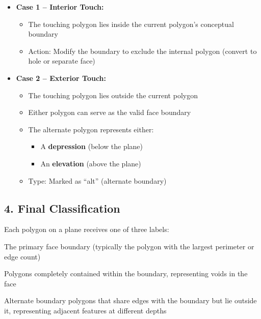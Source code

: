 \documentclass[11pt,a4paper]{article}
\begin{document}
\begin{itemize}
    \item \textbf{Case 1 -- Interior Touch:}
    \begin{itemize}
        \item The touching polygon lies inside the current polygon's conceptual boundary
        \item Action: Modify the boundary to exclude the internal polygon (convert to hole or separate face)
    \end{itemize}
    
    \item \textbf{Case 2 -- Exterior Touch:}
    \begin{itemize}
        \item The touching polygon lies outside the current polygon
        \item Either polygon can serve as the valid face boundary
        \item The alternate polygon represents either:
        \begin{itemize}
            \item A \textbf{depression} (below the plane)
            \item An \textbf{elevation} (above the plane)
        \end{itemize}
        \item Type: Marked as ``alt'' (alternate boundary)
    \end{itemize}
\end{itemize}

\subsection{4. Final Classification}

Each polygon on a plane receives one of three labels:

\begin{description}[style=nextline]
    \item[\textbf{``boundary'':}] The primary face boundary (typically the polygon with the largest perimeter or edge count)
    
    \item[\textbf{``holes'':}] Polygons completely contained within the boundary, representing voids in the face
    
    \item[\textbf{``alt'':}] Alternate boundary polygons that share edges with the boundary but lie outside it, representing adjacent features at different depths
\end{description}
\end{document}

